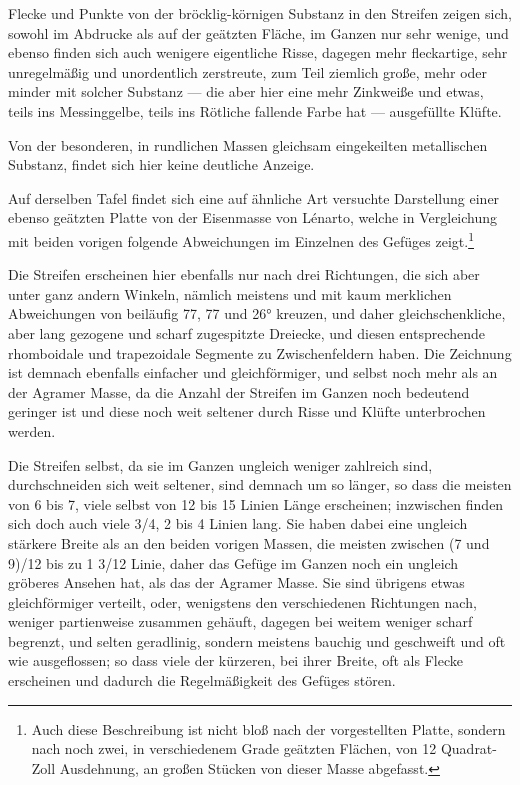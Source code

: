 \documentclass[a4paper, 11pt, oneside, german]{article}
\begin{document}
Flecke und Punkte von der bröcklig-körnigen Substanz in den Streifen zeigen sich, sowohl im Abdrucke als auf der geätzten Fläche, im Ganzen nur sehr wenige, und ebenso finden sich auch wenigere eigentliche Risse, dagegen mehr fleckartige, sehr unregelmäßig und unordentlich zerstreute, zum Teil ziemlich große, mehr oder minder mit solcher Substanz --- die aber hier eine mehr Zinkweiße und etwas, teils ins Messinggelbe, teils ins Rötliche fallende Farbe hat --- ausgefüllte Klüfte.

Von der besonderen, in rundlichen Massen gleichsam eingekeilten metallischen Substanz, findet sich hier keine deutliche Anzeige.

Auf derselben Tafel findet sich eine auf ähnliche Art versuchte Darstellung einer ebenso geätzten Platte von der Eisenmasse von Lénarto, welche in Vergleichung mit beiden vorigen folgende Abweichungen im Einzelnen des Gefüges zeigt.\footnote{Auch diese Beschreibung ist nicht bloß nach der vorgestellten Platte, sondern nach noch zwei, in verschiedenem Grade geätzten Flächen, von 12 Quadrat-Zoll Ausdehnung, an großen Stücken von dieser Masse abgefasst.}

Die Streifen erscheinen hier ebenfalls nur nach drei Richtungen, die sich aber unter ganz andern Winkeln, nämlich meistens und mit kaum merklichen Abweichungen von beiläufig 77, 77 und 26° kreuzen, und daher gleichschenkliche, aber lang gezogene und scharf zugespitzte Dreiecke, und diesen entsprechende rhomboidale und trapezoidale Segmente zu Zwischenfeldern haben. Die Zeichnung ist demnach ebenfalls einfacher und gleichförmiger, und selbst noch mehr als an der Agramer Masse, da die Anzahl der Streifen im Ganzen noch bedeutend geringer ist und diese noch weit seltener durch Risse und Klüfte unterbrochen werden.

Die Streifen selbst, da sie im Ganzen ungleich weniger zahlreich sind, durchschneiden sich weit seltener, sind demnach um so länger, so dass die meisten von 6 bis 7, viele selbst von 12 bis 15 Linien Länge erscheinen; inzwischen finden sich doch auch viele 3/4, 2 bis 4 Linien lang. Sie haben dabei eine ungleich stärkere Breite als an den beiden vorigen Massen, die meisten zwischen (7 und 9)/12 bis zu 1 3/12 Linie, daher das Gefüge im Ganzen noch ein ungleich gröberes Ansehen hat, als das der Agramer Masse. Sie sind übrigens etwas gleichförmiger verteilt, oder, wenigstens den verschiedenen Richtungen nach, weniger partienweise zusammen gehäuft, dagegen bei weitem weniger scharf begrenzt, und selten geradlinig, sondern meistens bauchig und geschweift und oft wie ausgeflossen; so dass viele der kürzeren, bei ihrer Breite, oft als Flecke erscheinen und dadurch die Regelmäßigkeit des Gefüges stören.
\end{document}

